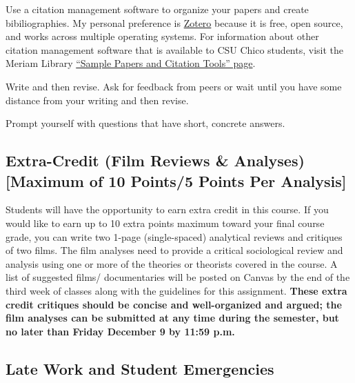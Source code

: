 \documentclass[11pt,]{article}
\begin{document}
Use a citation management software to organize your papers and create
bibiliographies. My personal preference is
\href{https://www.zotero.org/}{Zotero} because it is free, open source,
and works across multiple operating systems. For information about other
citation management software that is available to CSU Chico students,
visit the Meriam Library
\href{https://libguides.csuchico.edu/c.php?g=432300\&p=2948649}{``Sample
Papers and Citation Tools'' page}.

Write and then revise. Ask for feedback from peers or wait until you
have some distance from your writing and then revise.

Prompt yourself with questions that have short, concrete answers.

\hypertarget{extra-credit-film-reviews-analyses-maximum-of-10-points5-points-per-analysis}{%
\subsection{Extra-Credit (Film Reviews \& Analyses) {[}Maximum of 10
Points/5 Points Per
Analysis{]}}\label{extra-credit-film-reviews-analyses-maximum-of-10-points5-points-per-analysis}}

Students will have the opportunity to earn extra credit in this course.
If you would like to earn up to 10 extra points maximum toward your
final course grade, you can write two 1-page (single-spaced) analytical
reviews and critiques of two films. The film analyses need to provide a
critical sociological review and analysis using one or more of the
theories or theorists covered in the course. A list of suggested films/
documentaries will be posted on Canvas by the end of the third week of
classes along with the guidelines for this assignment. \textbf{These
extra credit critiques should be concise and well-organized and argued;
the film analyses can be submitted at any time during the semester, but
no later than Friday December 9 by 11:59 p.m.}

\hypertarget{late-work-and-student-emergencies}{%
\subsection{Late Work and Student
Emergencies}\label{late-work-and-student-emergencies}}
\end{document}
